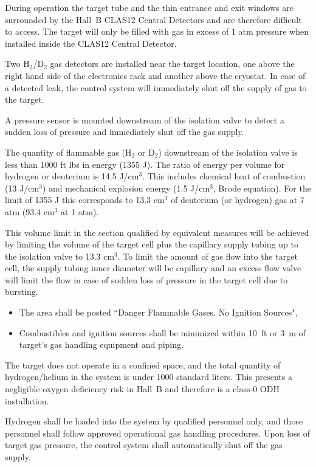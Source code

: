 During operation the target tube and the thin entrance and exit windows are surrounded by the Hall~B 
CLAS12 Central Detectors and are therefore difficult to access. 
The target will only be filled with gas in excess of 1 atm pressure when installed inside the CLAS12 Central Detector.

Two H$_2$/D$_2$ gas detectors are installed near the target location, one above the right hand 
side of the electronics rack and another above the cryostat. In case of a detected leak, the 
control system will immediately shut off the supply of gas to the target.

A pressure sensor is mounted downstream of the isolation valve to detect a sudden loss of pressure and
immediately shut off the gas supply.

The quantity of flammable gas (H$_2$ or D$_2$) downstream of the isolation valve is less than 1000 ft lbs in energy (1355 J).
The ratio of energy per volume for hydrogen or deuterium is 14.5 J/cm$^3$. This includes chemical heat of combustion 
(13 J/cm$^3$) and mechanical explosion energy (1.5 J/cm$^3$, Brode equation). 
For the limit of 1355 J this corresponds to 13.3 cm$^3$ of deuterium (or hydrogen) gas at 7 atm (93.4 cm$^3$ at 1 atm).

This volume limit in the section qualified by equivalent measures will be achieved by limiting the volume
of the target cell plus the capillary supply tubing up to the isolation valve to 13.3 cm$^3$. To limit the amount of 
gas flow into the target cell, the supply tubing inner diameter will be capillary and an excess flow valve 
will limit the flow in case of sudden loss of pressure in the target cell due to bursting.

\begin{itemize}
\item The area shall be posted ``Danger Flammable Gases.  No Ignition Sources",

\item Combustibles and ignition sources shall be minimized within 10~ft or 3~m of target's gas 
handling equipment and piping.
\end{itemize}

The target does not operate in a confined space, and the total quantity of hydrogen/helium in 
the system is under 1000 standard liters. This presents a negligible oxygen deficiency risk in 
Hall~B and therefore is a class-0 ODH installation.

Hydrogen shall be loaded into the system by qualified personnel only, and those personnel shall 
follow approved operational gas handling procedures.   Upon loss of target gas pressure, the 
control system shall automatically shut off the gas supply. 

